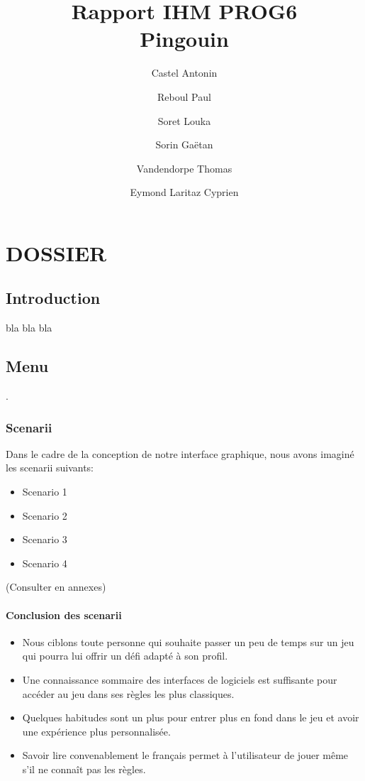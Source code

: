 \documentclass{report}
\title{\textbf{Rapport IHM PROG6}\\Pingouin}
\author{Castel Antonin \and Reboul Paul \and Soret Louka \and Sorin Gaëtan \and Vandendorpe Thomas \and Eymond Laritaz Cyprien}
\begin{document}
\maketitle{}
\tableofcontents
\part*{DOSSIER}

\chapter{Introduction}
bla bla bla
\chapter{Menu}
.

\section{Scenarii}
Dans le cadre de la conception de notre interface graphique, nous avons imaginé les scenarii suivants:

\begin{itemize}
\item Scenario 1
\item Scenario 2
\item Scenario 3
\item Scenario 4
\end{itemize}

(Consulter en annexes)

 
 
 
 \subsection{ Conclusion des scenarii }
 \begin{itemize}
  \item Nous ciblons toute personne qui souhaite passer un peu de temps sur un jeu qui pourra lui offrir un défi adapté à son profil.
  \item Une connaissance sommaire des interfaces de logiciels est suffisante pour accéder au jeu dans ses règles les plus classiques. 
  \item Quelques habitudes sont un plus pour entrer plus en fond dans le jeu et avoir une expérience plus personnalisée.
  \item Savoir lire convenablement le français permet à l'utilisateur de jouer même s'il ne connaît pas les règles.
 \end{itemize}
 
\end{document}
